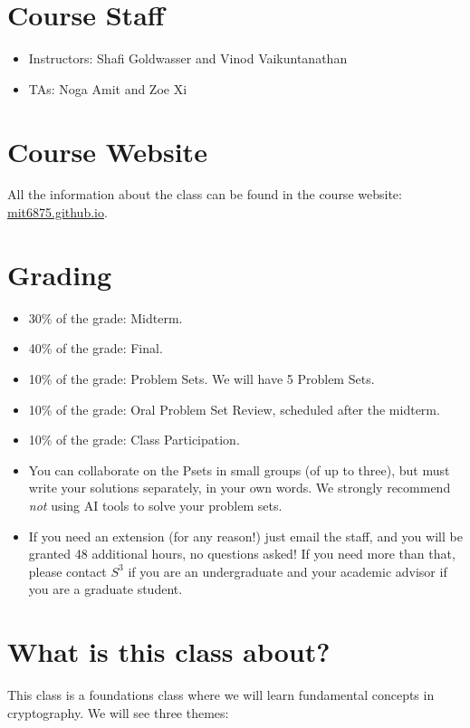 \section{Course Staff}
\begin{itemize}
    \item Instructors:  Shafi Goldwasser and Vinod Vaikuntanathan
    \item TAs:  Noga Amit and Zoe Xi
\end{itemize}

\section{Course Website}  
All the information about the class can be found in the course website:  \url{mit6875.github.io}.

\section{Grading}
\begin{itemize}
    \item 30\% of the grade:  Midterm.
    \item 40\% of the grade:  Final.
    \item 10\% of the grade:  Problem Sets.
    We will have 5 Problem Sets.
    \item 10\% of the grade: Oral Problem Set Review, scheduled after the midterm.
    \item 10\% of the grade: Class Participation.
    \item You can collaborate on the Psets in small groups (of up to three), but must write your solutions separately, in your own words. We strongly recommend {\em not} using AI tools to solve your problem sets. 
    \item If you need an extension (for any reason!) just email the staff, and you will be granted 48 additional hours, no questions asked!  If you need more than that, please contact $S^3$ if you are an undergraduate and your academic advisor if you are a graduate student.
\end{itemize}


\section{What is this class about?}

This class is a foundations class where we will learn fundamental concepts in cryptography.  We will see three themes:

